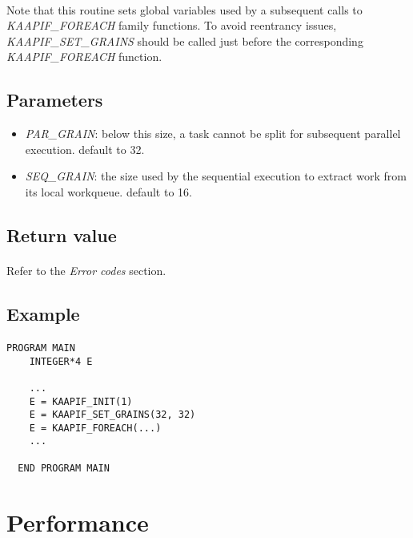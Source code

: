\documentclass[a4paper, 11pt]{article}
\begin{document}
\paragraph{}
Note that this routine sets global variables used by a subsequent calls to
\textit{KAAPIF\_FOREACH} family functions. To avoid reentrancy issues,
\textit{KAAPIF\_SET\_GRAINS} should be called just before the corresponding
\textit{KAAPIF\_FOREACH} function.

\subsection{Parameters}
\begin{itemize}
\item \textit{PAR\_GRAIN}: below this size, a task cannot be split for
subsequent parallel execution. default to 32.
\item \textit{SEQ\_GRAIN}: the size used by the sequential execution to
extract work from its local workqueue. default to 16.
\end{itemize}

\subsection{Return value}
\paragraph{}
Refer to the \textit{Error codes} section.

\subsection{Example}
\paragraph{}
\begin{small}
\begin{lstlisting}[frame=tb]
  PROGRAM MAIN
    INTEGER*4 E

    ...
    E = KAAPIF_INIT(1)
    E = KAAPIF_SET_GRAINS(32, 32)
    E = KAAPIF_FOREACH(...)
    ...

  END PROGRAM MAIN
\end{lstlisting}
\end{small}


\newpage
\section{Performance}
\end{document}
